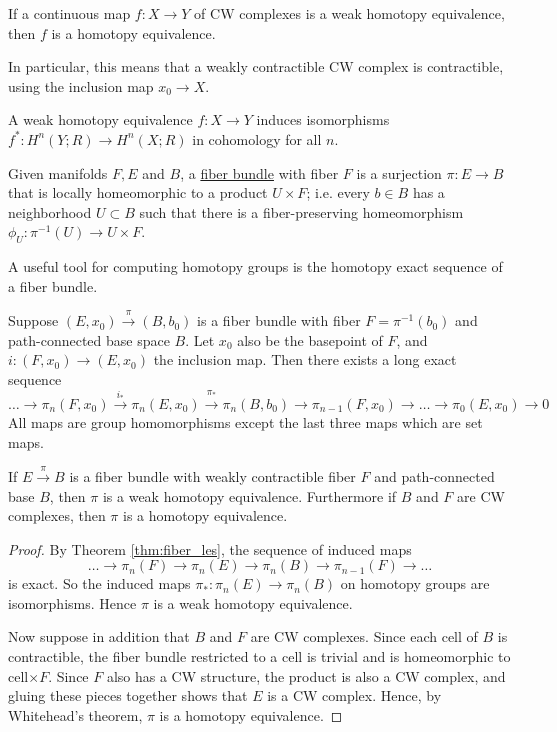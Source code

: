 \begin{thm} 
	If a continuous map $f:X\to Y$ of CW complexes 
	is a weak homotopy equivalence, then  $f$ is a homotopy equivalence. 
\end{thm}
In particular, this
means that a weakly contractible CW complex is contractible, using the inclusion
map $x_0 \to X$. 

\begin{thm} \label{thm:weak_to_cohomology}
	A weak homotopy equivalence $f:X\to Y$ induces isomorphisms
	$f^*:H^n(Y;R)\to H^n(X;R)$ in cohomology for all  $n$.
\end{thm}
\begin{defn}
	Given manifolds $F,E$ and $B$, 
	a \underline{fiber bundle} with fiber $F$ is a surjection  $\pi: E\to B$
	that is locally homeomorphic to a product $U\times F$; i.e. every  $b\in B$
	has a neighborhood  $U\subset B$ such that there is a fiber-preserving
	homeomorphism $\phi_U : \pi^{-1}(U) \to U\times F$.
\end{defn}
A useful tool for computing homotopy groups is the homotopy exact sequence of a
fiber bundle. 
\begin{thm} \label{thm:fiber_les}
	Suppose $(E,x_0) \xrightarrow{\pi} (B,b_0)$ is a fiber bundle with fiber
	$F=\pi^{-1}(b_0)$ and path-connected base space $B$. Let  $x_0$ also be the
	basepoint of $F$, and  $i:(F,x_0)\to (E,x_0)$ the inclusion map. Then there
	exists a long exact sequence
	\[
		\ldots\to\pi_n(F,x_0) \xrightarrow{i_*}\pi_n(E,x_0)
		\overset{\pi_*}{\xrightarrow{}}\pi_n(B,b_0)
		\to \pi_{n-1}(F,x_0)\to\ldots\to\pi_0(E,x_0)\to 0
	\] 
	All maps are group homomorphisms except the last three maps which are set
	maps.
\end{thm}

\begin{prop} \label{prop:total_base_iso}
	If $E \xrightarrow{\pi} B$ is a fiber bundle with weakly contractible fiber $F$
	and path-connected base $B$, then $\pi$ is a weak homotopy equivalence.
	Furthermore if $B$ and $F$ are CW complexes, 
	then $\pi$ is a homotopy equivalence.  
\end{prop}
\begin{proof}
	By Theorem \ref{thm:fiber_les}, the sequence of induced maps
	\[
	\ldots \to \pi_n(F) \to \pi_n(E) \to\pi_n(B) \to
	\pi_{n-1}(F)\to \ldots
	\] 
	is exact. So the induced maps $\pi_* : \pi_n(E) \to
	\pi_n(B)$ on homotopy groups are isomorphisms. Hence $\pi$ is a weak
	homotopy equivalence. 

	Now suppose in addition that $B$ and $F$ are CW complexes. 
	Since each cell of $B$ is contractible, the fiber bundle
	restricted to a cell is trivial and is homeomorphic to  cell$\times F$. 
	Since  $F$ also has a CW structure, the product is also a CW complex, and
	gluing these pieces together shows that $E$ is a CW complex. Hence, by
	Whitehead's theorem,  $\pi$ is a homotopy equivalence. 
\end{proof}

